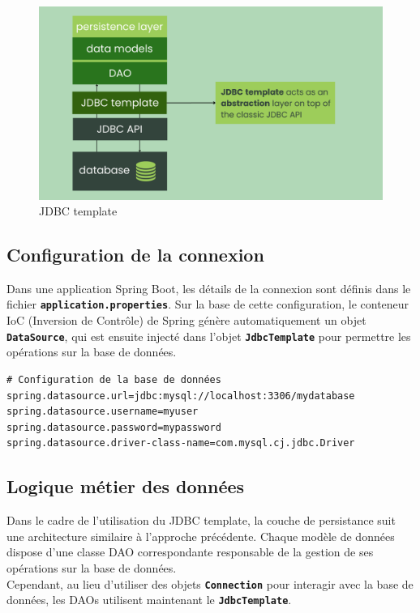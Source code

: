 \documentclass{article}
\begin{document}
\begin{figure}[H]
    \centering
    \begin{framed}
        \includegraphics[width=0.8\linewidth]{images/jdbc_template.png}
    \end{framed}
    \caption{JDBC template}
    \label{fig:spring-logo}
\end{figure}

\subsection{Configuration de la connexion} 
Dans une application Spring Boot, les détails de la connexion sont définis dans le fichier \textbf{\texttt{application.properties}}. Sur la base de cette configuration, le conteneur IoC (Inversion de Contrôle) de Spring génère automatiquement un objet \textbf{\texttt{DataSource}}, qui est ensuite injecté dans l'objet \textbf{\texttt{JdbcTemplate}} pour permettre les opérations sur la base de données.
\\
\begin{lstlisting}[caption={Configuration de la base de données MySQL}]
# Configuration de la base de données
spring.datasource.url=jdbc:mysql://localhost:3306/mydatabase
spring.datasource.username=myuser
spring.datasource.password=mypassword
spring.datasource.driver-class-name=com.mysql.cj.jdbc.Driver

\end{lstlisting}

\subsection{Logique métier des données}

Dans le cadre de l'utilisation du JDBC template, la couche de persistance suit une architecture similaire à l'approche précédente. Chaque modèle de données dispose d'une classe DAO correspondante responsable de la gestion de ses opérations sur la base de données.
\\
Cependant, au lieu d'utiliser des objets \textbf{\texttt{Connection}} pour interagir avec la base de données, les DAOs utilisent maintenant le \textbf{\texttt{JdbcTemplate}}.
\end{document}
